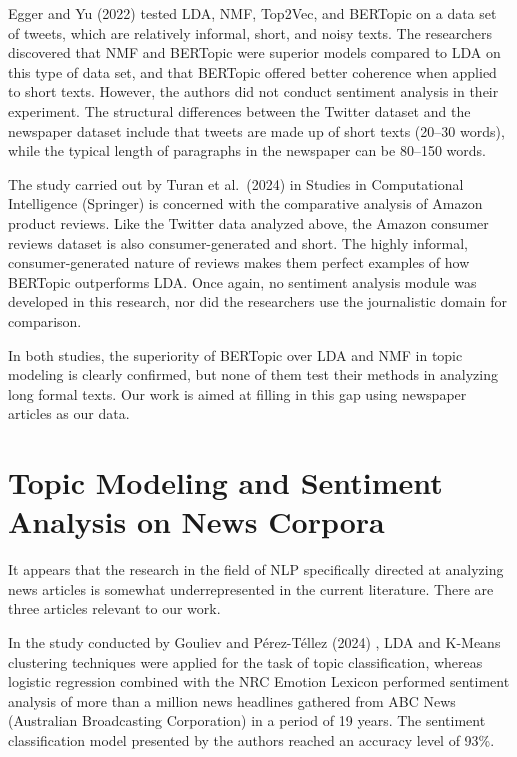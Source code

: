 Egger and Yu (2022) \cite{egger2022} tested LDA, NMF, Top2Vec, and BERTopic on a data set of tweets, which are relatively informal, short, and noisy texts. The researchers discovered that NMF and BERTopic were superior models compared to LDA on this type of data set, and that BERTopic offered better coherence when applied to short texts. However, the authors did not conduct sentiment analysis in their experiment. The structural differences between the Twitter dataset and the newspaper dataset include that tweets are made up of short texts (20--30 words), while the typical length of paragraphs in the newspaper can be 80--150 words.

The study carried out by Turan et al.\ (2024) \cite{turan2024} in Studies in Computational Intelligence (Springer) is concerned with the comparative analysis of Amazon product reviews. Like the Twitter data analyzed above, the Amazon consumer reviews dataset is also consumer-generated and short. The highly informal, consumer-generated nature of reviews makes them perfect examples of how BERTopic outperforms LDA. Once again, no sentiment analysis module was developed in this research, nor did the researchers use the journalistic domain for comparison.

In both studies, the superiority of BERTopic over LDA and NMF in topic modeling is clearly confirmed, but none of them test their methods in analyzing long formal texts. Our work is aimed at filling in this gap using newspaper articles as our data.

\section{Topic Modeling and Sentiment Analysis on News Corpora}

It appears that the research in the field of NLP specifically directed at analyzing news articles is somewhat underrepresented in the current literature. There are three articles relevant to our work.

In the study conducted by Gouliev and P{\'e}rez-T{\'e}llez (2024) \cite{gouliev2024}, LDA and K-Means clustering techniques were applied for the task of topic classification, whereas logistic regression combined with the NRC Emotion Lexicon performed sentiment analysis of more than a million news headlines gathered from ABC News (Australian Broadcasting Corporation) in a period of 19 years. The sentiment classification model presented by the authors reached an accuracy level of 93\%.

